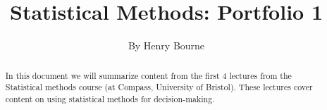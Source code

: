 \documentclass[a4paper]{article}
\title{Statistical Methods: Portfolio 1}
\author{By Henry Bourne}
\date{}
\begin{document}
\maketitle


\begin{abstract}
    In this document we will summarize content from the first 4 lectures from the Statistical methods course (at Compass, University of Bristol). These lectures cover content on using statistical methods for decision-making.
\end{abstract}





\small


\end{document}
